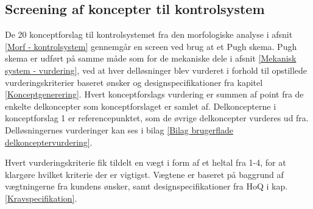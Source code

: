 \subsection{Screening af koncepter til kontrolsystem} \label{Kontrolsystem - vurdering}

De 20 konceptforslag til kontrolsystemet fra den morfologiske analyse i afsnit \ref{Morf - kontrolsystem} gennemgår en screen ved brug at et Pugh skema. Pugh skema er udført på samme måde som for de mekaniske dele i afsnit \ref{Mekanisk system - vurdering}, ved at hver delløsninger blev vurderet i forhold til opstillede vurderingskriterier baseret ønsker og designspecifikationer fra kapitel \ref{Konceptgenerering}. Hvert konceptforslags vurdering er summen af point fra de enkelte delkoncepter som konceptforslaget er samlet af. Delkoncepterne i konceptforslag 1 er referencepunktet, som de øvrige delkoncepter vurderes ud fra. Delløsningernes vurderinger kan ses i bilag \ref{Bilag brugerflade delkonceptervurdering}. 

Hvert vurderingskriterie fik tildelt en vægt i form af et heltal fra 1-4, for at klargøre hvilket kriterie der er vigtigst. Vægtene er baseret på baggrund af vægtningerne fra kundens ønsker, samt designspecifikationer fra HoQ i kap. \ref{Kravspecifikation}.




